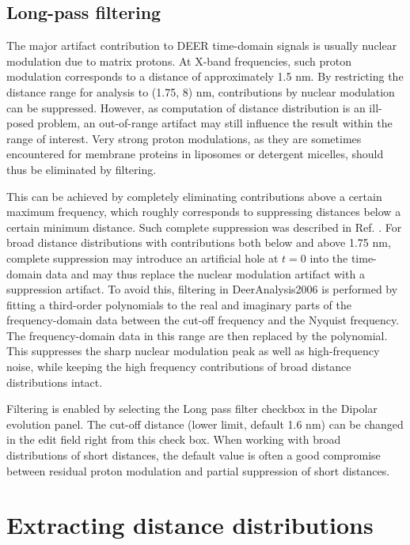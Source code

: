 \documentclass{article}
\begin{document}
\subsection{Long-pass filtering}
The major artifact contribution to DEER time-domain signals is usually nuclear
modulation due to matrix protons. At X-band frequencies, such proton modulation
corresponds to a distance of approximately 1.5 nm. By restricting the distance range for analysis to (1.75, 8) nm, contributions by nuclear modulation can be suppressed. However, as computation of distance distribution is an ill-posed problem, an out-of-range artifact may
still influence the result within the range of interest. Very strong proton modulations,
as they are sometimes encountered for membrane proteins in liposomes
or detergent micelles, should thus be eliminated by filtering.

This can be achieved by completely eliminating contributions above a certain
maximum frequency, which roughly corresponds to suppressing distances
below a certain minimum distance. Such complete suppression was described in
Ref. \cite{jeschke2004b}. For broad distance distributions with contributions both below and above 1.75 nm, complete suppression may introduce an artificial hole at $t = 0$ into the time-domain data and may thus replace the nuclear modulation artifact with a suppression
artifact. To avoid this, filtering in DeerAnalysis2006 is performed by fitting a third-order polynomials to the real and imaginary parts of the frequency-domain data between
the cut-off frequency and the Nyquist frequency. The frequency-domain data
in this range are then replaced by the polynomial. This suppresses the sharp
nuclear modulation peak as well as high-frequency noise, while keeping the high frequency
contributions of broad distance distributions intact.

Filtering is enabled by selecting the {\ttfamily Long pass filter} checkbox in the
{\ttfamily Dipolar evolution} panel. The cut-off distance (lower limit, default
1.6 nm) can be changed in the edit field right from this check box. When
working with broad distributions of short distances, the default value is often a
good compromise between residual proton modulation and partial suppression
of short distances.

\section{Extracting distance distributions}
\label{distribution}
\end{document}
